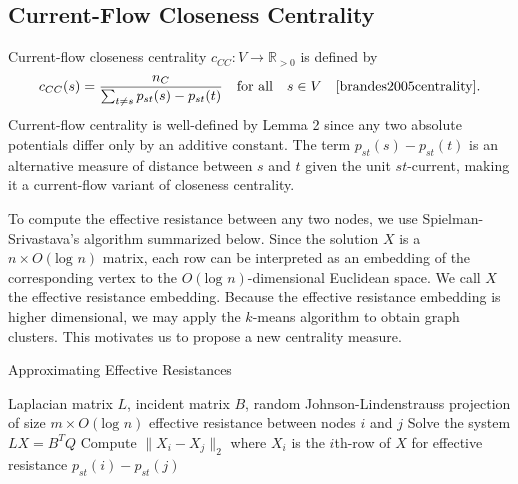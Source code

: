 \documentclass[10pt]{siamltex}
\begin{document}
\begin{pagewiselinenumbers}
\subsection{Current-Flow Closeness Centrality}
Current-flow closeness centrality $c_{CC}: V \rightarrow \mathbb{R}_{>0}$ is defined by 
\begin{align}
c_{CC}(s) = \frac{n_C}{\sum_{t \neq s} p_{st}(s) - p_{st}(t)} \quad \textrm{for all} \quad s \in V \quad \cite{brandes2005centrality}.
\end{align}
Current-flow centrality is well-defined by Lemma 2 since any two absolute potentials differ only by an additive constant. The term $p_{st}(s) - p_{st}(t)$ is an alternative measure of distance between $s$ and $t$ given the unit $st$-current, making it a current-flow variant of closeness centrality.

To compute the effective resistance between any two nodes, we use Spielman-Srivastava's algorithm summarized below. Since the solution $X$ is a $n \times O(\textrm{log } n)$ matrix, each row can be interpreted as an embedding of the corresponding vertex to the $O(\textrm{log }n)$-dimensional Euclidean space. We call $X$ the effective resistance embedding. Because the effective resistance embedding is higher dimensional, we may apply the $k$-means algorithm to obtain graph clusters. This motivates us to propose a new centrality measure.

\begin{algorithm}                    %
\caption{Approximating Effective Resistances \cite{Spielman2011}}          %
\label{alg2}                           %
\begin{algorithmic}                    %
    \REQUIRE Laplacian matrix $L$, incident matrix $B$, random Johnson-Lindenstrauss projection of size $m \times O(\textrm{log } n)$
\RETURN effective resistance between nodes $i$ and $j$ 
\STATE Solve the system $LX = B^{T}Q$
\STATE Compute $\|X_i - X_j\|_2$ where $X_i$ is the $i$th-row of $X$ for effective resistance $p_{st}(i) - p_{st}(j)$
\end{algorithmic}
\end{algorithm}

\end{pagewiselinenumbers}
\end{document}
